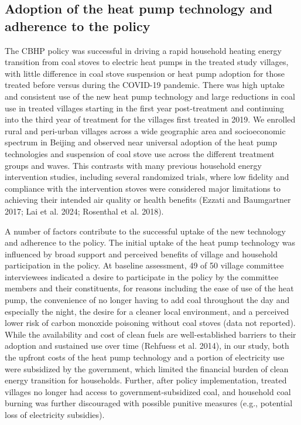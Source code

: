 \documentclass[
  letterpaper,
  DIV=11,
  numbers=noendperiod]{scrartcl}
\begin{document}
\subsection{Adoption of the heat pump technology and adherence to the
policy}\label{adoption-of-the-heat-pump-technology-and-adherence-to-the-policy}

The CBHP policy was successful in driving a rapid household heating
energy transition from coal stoves to electric heat pumps in the treated
study villages, with little difference in coal stove suspension or heat
pump adoption for those treated before versus during the COVID-19
pandemic. There was high uptake and consistent use of the new heat pump
technology and large reductions in coal use in treated villages starting
in the first year post-treatment and continuing into the third year of
treatment for the villages first treated in 2019. We enrolled rural and
peri-urban villages across a wide geographic area and socioeconomic
spectrum in Beijing and observed near universal adoption of the heat
pump technologies and suspension of coal stove use across the different
treatment groups and waves. This contrasts with many previous household
energy intervention studies, including several randomized trials, where
low fidelity and compliance with the intervention stoves were considered
major limitations to achieving their intended air quality or health
benefits (Ezzati and Baumgartner 2017; Lai et al. 2024; Rosenthal et al.
2018).

A number of factors contribute to the successful uptake of the new
technology and adherence to the policy. The initial uptake of the heat
pump technology was influenced by broad support and perceived benefits
of village and household participation in the policy. At baseline
assessment, 49 of 50 village committee interviewees indicated a desire
to participate in the policy by the committee members and their
constituents, for reasons including the ease of use of the heat pump,
the convenience of no longer having to add coal throughout the day and
especially the night, the desire for a cleaner local environment, and a
perceived lower risk of carbon monoxide poisoning without coal stoves
(data not reported). While the availability and cost of clean fuels are
well-established barriers to their adoption and sustained use over time
(Rehfuess et al. 2014), in our study, both the upfront costs of the heat
pump technology and a portion of electricity use were subsidized by the
government, which limited the financial burden of clean energy
transition for households. Further, after policy implementation, treated
villages no longer had access to government-subsidized coal, and
household coal burning was further discouraged with possible punitive
measures (e.g., potential loss of electricity subsidies).
\end{document}

